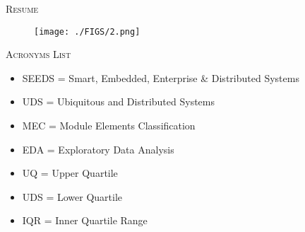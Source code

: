 \documentclass[12pt]{extreport}
\begin{document}
\newpage
\thispagestyle{empty}
\begin{center}
\textsc{\LARGE Resume}\\
[1.5cm]
\end{center}

\begin{figure}[H]
	\centering
	\texttt{[image: ./FIGS/2.png]}
	\label{fig:012}
\end{figure}

\begin{comment}


\large Ce rapport est le fruit du travail réalisé pendant la période du stage de fin d'études avec SEEDS INPT. La mission au cours des six mois du stage consistait à collecter les données de la première génération d'étudiants UDS pendant les trois années de formation à l'INPT, puis à les analyser pour détecter tout modèle existant.\\


il y a trois ans, l'INPT a créé sept nouvelles branches, dont l'UDS, le but de ce projet est d'analyser les données de cette branche et de voir s'il y a des conclusions utiles.\\


L'analyse des données est à la fois importante pour comprendre comment fonctionne un système et pour trouver des moyens potentiels de l'améliorer. 

\end{comment}

\newpage
\thispagestyle{empty}
\begin{center}
	\textsc{\Huge Acronyms List\\[2cm]
	}
	
	\begin{itemize}
		\item SEEDS = Smart, Embedded, Enterprise \& Distributed Systems
		\item UDS = Ubiquitous and Distributed Systems 
		\item MEC = Module Elements Classification
		\item EDA = Exploratory Data Analysis
		\item UQ = Upper Quartile
		\item UDS = Lower Quartile
		\item IQR = Inner Quartile Range
				
	\end{itemize}
\end{center} 
\end{document}
